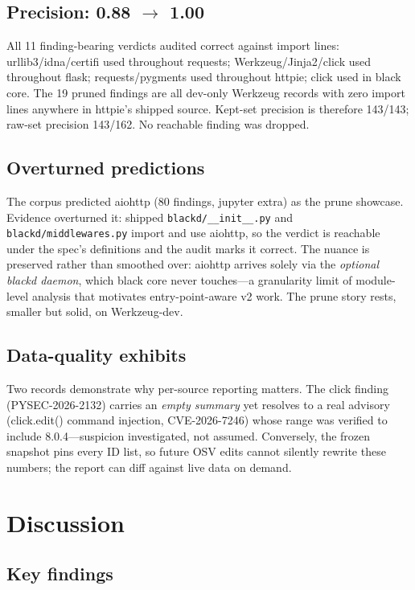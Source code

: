 \documentclass[11pt,a4paper]{article}
\begin{document}
\subsection{Precision: 0.88 $\to$ 1.00}

All 11 finding-bearing verdicts audited correct against import lines: urllib3/idna/certifi used throughout requests; Werkzeug/Jinja2/click used throughout flask; requests/pygments used throughout httpie; click used in black core. The 19 pruned findings are all dev-only Werkzeug records with zero import lines anywhere in httpie's shipped source. Kept-set precision is therefore 143/143; raw-set precision 143/162. No reachable finding was dropped.

\subsection{Overturned predictions}

The corpus predicted aiohttp (80 findings, jupyter extra) as the prune showcase. Evidence overturned it: shipped \verb!blackd/__init__.py! and \verb!blackd/middlewares.py! import and use aiohttp, so the verdict is reachable under the spec's definitions and the audit marks it correct. The nuance is preserved rather than smoothed over: aiohttp arrives solely via the \textit{optional blackd daemon}, which black core never touches---a granularity limit of module-level analysis that motivates entry-point-aware v2 work. The prune story rests, smaller but solid, on Werkzeug-dev.

\subsection{Data-quality exhibits}

Two records demonstrate why per-source reporting matters. The click finding (PYSEC-2026-2132) carries an \textit{empty summary} yet resolves to a real advisory (click.edit() command injection, CVE-2026-7246) whose range was verified to include 8.0.4---suspicion investigated, not assumed. Conversely, the frozen snapshot pins every ID list, so future OSV edits cannot silently rewrite these numbers; the report can diff against live data on demand.

\section{Discussion}
\label{sec:discussion}

\subsection{Key findings}
\end{document}
